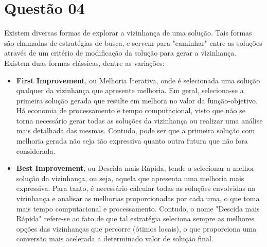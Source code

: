 	\section*{Questão 04}
	Existem diversas formas de explorar a vizinhança de uma solução. Tais formas são chamadas de estratégias de busca, e servem para "caminhar" entre as soluções através de um critério de modificação da solução para gerar a vizinhança. Existem duas formas clássicas, dentre as variações:
	\begin{itemize}
		\item \textbf{First Improvement}, ou Melhoria Iterativa, onde é selecionada uma solução qualquer
		da vizinhança que apresente melhoria. Em geral, seleciona-se a primeira solução gerada que resulte
		em melhora no valor da função-objetivo. Há economia de processamento e tempo computacional, visto que não se torna necessário gerar todas as soluções da vizinhança ou realizar uma análise mais detalhada das mesmas. Contudo, pode ser que a primeira solução com melhoria gerada não seja tão expressiva quanto outra futura que não fora considerada.
		\item \textbf{Best Improvement}, ou Descida mais Rápida, tende a selecionar a melhor solução da vizinhança, ou seja, aquela que apresenta uma melhoria mais expressiva. Para tanto, é necessário calcular todas as soluções envolvidas na vizinhança e analisar as melhorias proporcionadas por cada uma, o que toma mais tempo computacional e processamento. Contudo, o nome "Descida mais Rápida" refere-se ao fato de que tal estratégia seleciona sempre as melhores opções das vizinhanças que percorre (ótimos locais), o que proporciona uma conversão mais acelerada a determinado valor de solução final.
	\end{itemize}

